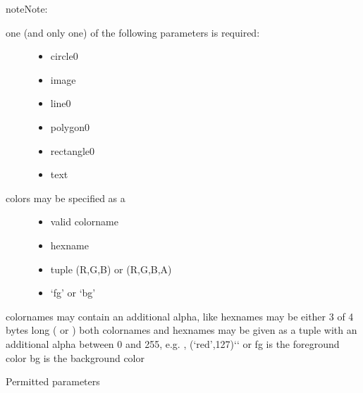 \documentclass[letterpaper,10pt,english]{sphinxmanual}
\begin{document}
\begin{fulllineitems}
\begin{quote}
\begin{description}
\end{description}\end{quote}

\begin{sphinxadmonition}{note}{Note:}\begin{description}
\item[{one (and only one) of the following parameters is required:}] \leavevmode\begin{itemize}
\item {} 
circle0

\item {} 
image

\item {} 
line0

\item {} 
polygon0

\item {} 
rectangle0

\item {} 
text

\end{itemize}

\item[{colors may be specified as a}] \leavevmode\begin{itemize}
\item {} 
valid colorname

\item {} 
hexname

\item {} 
tuple (R,G,B) or (R,G,B,A)

\item {} 
‘fg’ or ‘bg’

\end{itemize}

\end{description}

colornames may contain an additional alpha, like  
hexnames may be either 3 of 4 bytes long ( or ) 
both colornames and hexnames may be given as a tuple with an
additional alpha between 0 and 255,
e.g. , (‘red’,127){}`{}` or  
fg is the foreground color 
bg is the background color 

Permitted parameters



\end{sphinxadmonition}
\end{fulllineitems}
\end{document}
